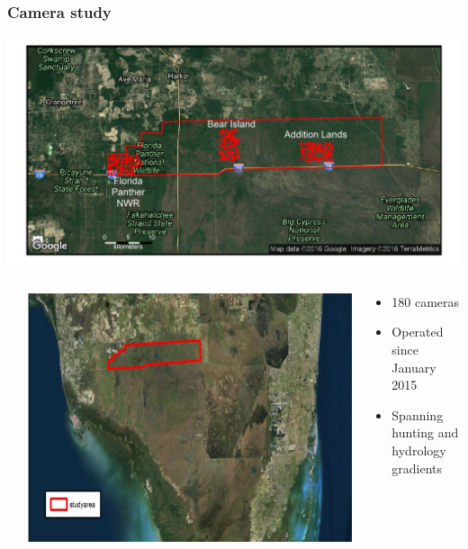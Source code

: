\documentclass[color=usenames,dvipsnames]{beamer}
\begin{document}
\begin{frame}
  \frametitle{Camera study}
  \centering
  \includegraphics[width=\textwidth]{figs/FL-base-cameras} \\
  \vfill
  \begin{columns}
    \begin{column}{0.05\textwidth}
    \end{column}
    \begin{column}{0.35\textwidth}
      \includegraphics[width=\textwidth,trim = 0mm 8mm 0mm 0mm, clip]{figs/studyArea}
    \end{column}
    \begin{column}{0.6\textwidth}
      \small
      \begin{itemize}
        \item 180 cameras
        \item Operated since January 2015
        \item Spanning hunting and hydrology gradients
      \end{itemize}
    \end{column}
  \end{columns}
\end{frame}
\end{document}
